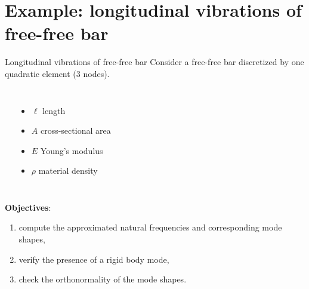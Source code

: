 \documentclass[aspectratio=169]{beamer}
\begin{document}
\section{Example: longitudinal vibrations of free-free bar}

\begin{frame}{Longitudinal vibrations of free-free bar}
  Consider a free-free bar discretized by one quadratic element (3 nodes).
  \begin{columns}
    \begin{center}
    \end{center}
    {\small \begin{itemize}
        \item $\ell$ length
        \item $A$ cross-sectional area
        \item $E$ Young's modulus
        \item $\rho$ material density
      \end{itemize}}
  \end{columns}
  \begin{block}{}
    \textbf{Objectives}:
    \begin{enumerate}
      \item compute the approximated natural frequencies and corresponding mode shapes,
      \item verify the presence of a rigid body mode,
      \item check the orthonormality of the mode shapes.
    \end{enumerate}
  \end{block}
\end{frame}
\end{document}
